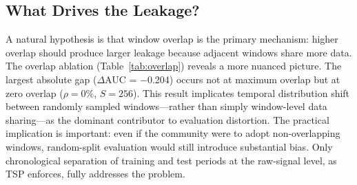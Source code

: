 \documentclass[preprint,12pt]{elsarticle}
\begin{document}
\begin{table}[htbp]
\centering
\small\setlength{\tabcolsep}{4pt}
\caption{Temporal leakage across five datasets (LSTM-AE, mean of 3 seeds). $\Delta$AUC = AUC$_\text{random} - $AUC$_\text{temporal}$. Positive values: random split inflates performance; negative: deflates.}
\label{tab:leakage}
\end{table}


\subsection{What Drives the Leakage?}

A natural hypothesis is that window overlap is the primary mechanism: higher overlap should produce larger leakage because adjacent windows share more data. The overlap ablation (Table~\ref{tab:overlap}) reveals a more nuanced picture. The largest absolute gap ($\Delta$AUC = $-$0.204) occurs not at maximum overlap but at zero overlap ($\rho = 0\%$, $S = 256$). This result implicates temporal distribution shift between randomly sampled windows---rather than simply window-level data sharing---as the dominant contributor to evaluation distortion. The practical implication is important: even if the community were to adopt non-overlapping windows, random-split evaluation would still introduce substantial bias. Only chronological separation of training and test periods at the raw-signal level, as TSP enforces, fully addresses the problem.
\end{document}
